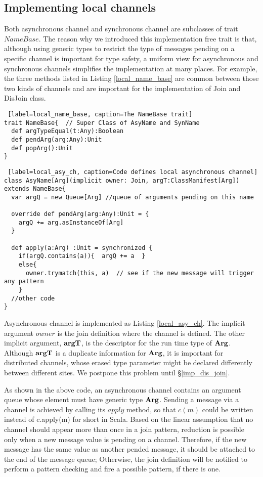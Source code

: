 \subsection{Implementing local channels}
\label{imp_loc_join}
Both asynchronous channel and synchronous channel are subclasses of trait $NameBase$.  The reason why we introduced this implementation free trait is that, although using generic types to restrict the type of messages pending on a specific channel is important for type safety, a uniform view for asynchronous and synchronous channels simplifies the implementation at many places.  For example, the three methods listed in Listing \ref{local_name_base} are common between those two kinds of channels and are important for the implementation of Join and DisJoin class.

\begin{lstlisting} [label=local_name_base, caption=The NameBase trait]
trait NameBase{  // Super Class of AsyName and SynName
  def argTypeEqual(t:Any):Boolean
  def pendArg(arg:Any):Unit
  def popArg():Unit
}
\end{lstlisting}

\begin{lstlisting} [label=local_asy_ch, caption=Code defines local asynchronous channel]
class AsyName[Arg](implicit owner: Join, argT:ClassManifest[Arg]) extends NameBase{
  var argQ = new Queue[Arg] //queue of arguments pending on this name

  override def pendArg(arg:Any):Unit = {
    argQ += arg.asInstanceOf[Arg]
  }

  def apply(a:Arg) :Unit = synchronized { 
    if(argQ.contains(a)){  argQ += a  }
    else{
      owner.trymatch(this, a)  // see if the new message will trigger any pattern
    }
  //other code
}
\end{lstlisting}

Asynchronous channel is implemented as Listing \ref{local_asy_ch}.  The implicit argument $owner$ is the join definition where the channel is defined.  The other implicit argument, $\bf{argT}$, is the descriptor for the run time type of $\bf{Arg}$.  Although $\bf{argT}$ is a duplicate information for $\bf{Arg}$, it is important for distributed channels, whose erased type parameter might be declared differently between different sites.  We postpone this problem until  \S\ref{imp_dis_join}.

As shown in the above code, an asynchronous channel contains an argument queue whose element must have generic type $\bf{Arg}$.  Sending a message via a channel is achieved by calling its $apply$ method, so that $c(m)$ could be written instead of c.apply(m) for short in Scala.   Based on the linear assumption that no channel should appear more than once in a join pattern, reduction is possible only when a new message value is pending on a channel.  Therefore, if the new message has the same value as another pended message, it should be attached to the end of the message queue;  Otherwise, the join definition will be notified to perform a pattern checking and fire a possible pattern, if there is one.

